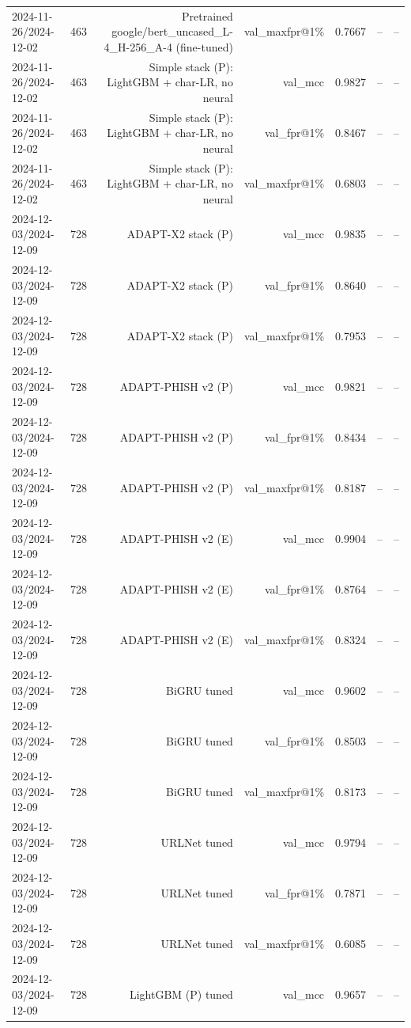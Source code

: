 \begin{table}[t]
\begin{tabular}{llrrrrr}
2024-11-26/2024-12-02 & 463 & Pretrained google/bert\_uncased\_L-4\_H-256\_A-4 (fine-tuned) & val\_maxfpr@1\% & 0.7667 & -- & -- \\
2024-11-26/2024-12-02 & 463 & Simple stack (P): LightGBM + char-LR, no neural & val\_mcc & 0.9827 & -- & -- \\
2024-11-26/2024-12-02 & 463 & Simple stack (P): LightGBM + char-LR, no neural & val\_fpr@1\% & 0.8467 & -- & -- \\
2024-11-26/2024-12-02 & 463 & Simple stack (P): LightGBM + char-LR, no neural & val\_maxfpr@1\% & 0.6803 & -- & -- \\
2024-12-03/2024-12-09 & 728 & ADAPT-X2 stack (P) & val\_mcc & 0.9835 & -- & -- \\
2024-12-03/2024-12-09 & 728 & ADAPT-X2 stack (P) & val\_fpr@1\% & 0.8640 & -- & -- \\
2024-12-03/2024-12-09 & 728 & ADAPT-X2 stack (P) & val\_maxfpr@1\% & 0.7953 & -- & -- \\
2024-12-03/2024-12-09 & 728 & ADAPT-PHISH v2 (P) & val\_mcc & 0.9821 & -- & -- \\
2024-12-03/2024-12-09 & 728 & ADAPT-PHISH v2 (P) & val\_fpr@1\% & 0.8434 & -- & -- \\
2024-12-03/2024-12-09 & 728 & ADAPT-PHISH v2 (P) & val\_maxfpr@1\% & 0.8187 & -- & -- \\
2024-12-03/2024-12-09 & 728 & ADAPT-PHISH v2 (E) & val\_mcc & 0.9904 & -- & -- \\
2024-12-03/2024-12-09 & 728 & ADAPT-PHISH v2 (E) & val\_fpr@1\% & 0.8764 & -- & -- \\
2024-12-03/2024-12-09 & 728 & ADAPT-PHISH v2 (E) & val\_maxfpr@1\% & 0.8324 & -- & -- \\
2024-12-03/2024-12-09 & 728 & BiGRU tuned & val\_mcc & 0.9602 & -- & -- \\
2024-12-03/2024-12-09 & 728 & BiGRU tuned & val\_fpr@1\% & 0.8503 & -- & -- \\
2024-12-03/2024-12-09 & 728 & BiGRU tuned & val\_maxfpr@1\% & 0.8173 & -- & -- \\
2024-12-03/2024-12-09 & 728 & URLNet tuned & val\_mcc & 0.9794 & -- & -- \\
2024-12-03/2024-12-09 & 728 & URLNet tuned & val\_fpr@1\% & 0.7871 & -- & -- \\
2024-12-03/2024-12-09 & 728 & URLNet tuned & val\_maxfpr@1\% & 0.6085 & -- & -- \\
2024-12-03/2024-12-09 & 728 & LightGBM (P) tuned & val\_mcc & 0.9657 & -- & -- \\

\end{tabular}
\end{table}
